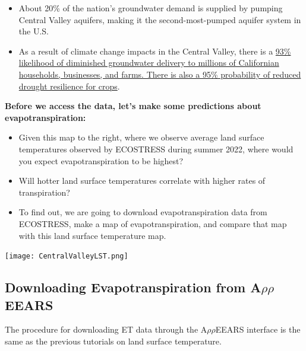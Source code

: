 \documentclass[oneside,a4paper,11pt,explicit]{book}
\begin{document}
\begin{tcolorbox}[colback=yellow!5!white,colframe=IceCreamLeaf,title=\textbf{California's Central Valley}]
\begin{multicols}{2}
\begin{itemize}
			\item About 20\% of the nation's groundwater demand is supplied by pumping Central Valley aquifers, making it the second-most-pumped aquifer system in the U.S.
			\item As a result of climate change impacts in the Central Valley, there is a \href{https://www.energy.ca.gov/sites/default/files/2019-12/Water_CCCA4-EXT-2018-001_ada.pdf}{93\% likelihood of diminished groundwater delivery to millions of Californian households, businesses, and farms. There is also a 95\% probability of reduced drought resilience for crops}. 
		\end{itemize}
	\end{multicols}
\end{tcolorbox}

\begin{tcolorbox}[colback=yellow!5!white,colframe=IceCreamLeaf,title=\textbf{Hypotheses}]
	\begin{multicols}{2}

		\vspace*{.25em}

		\textbf{Before we access the data, let's make some predictions about evapotranspiration:}

		\begin{itemize}
			\item Given this map to the right, where we observe average land surface temperatures observed by ECOSTRESS during summer 2022, where would you expect evapotranspiration to be highest?
			\item Will hotter land surface temperatures correlate with higher rates of transpiration?
			\item To find out, we are going to download evapotranspiration data from ECOSTRESS, make a map of evapotranspiration, and compare that map with this land surface temperature map.
		\end{itemize}

		\columnbreak	

		\centerline{\texttt{[image: CentralValleyLST.png]}}
		
	\end{multicols}
\end{tcolorbox}

\subsection{Downloading Evapotranspiration from A$\rho\rho$EEARS}

The procedure for downloading ET data through the A$\rho\rho$EEARS interface is the same as the previous tutorials on land surface temperature.
\end{document}
